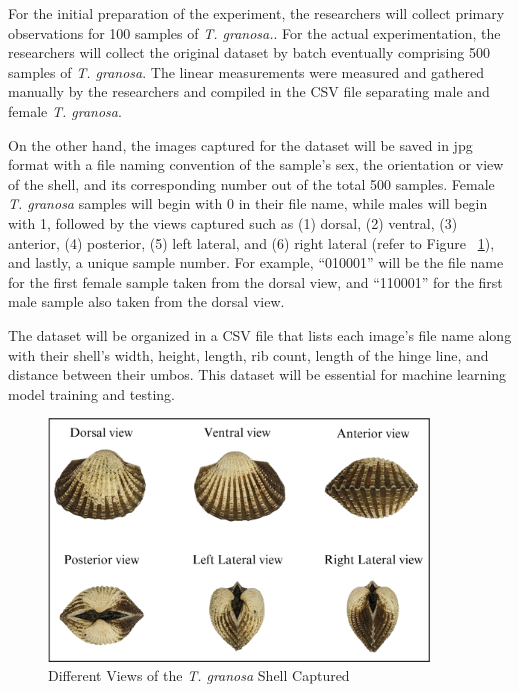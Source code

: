 For the initial preparation of the experiment, the researchers will collect primary observations for 100 samples of \textit{T. granosa.}. For the actual experimentation, the researchers will collect the original dataset by batch eventually comprising 500 samples of \textit{T. granosa}. The linear measurements were measured and gathered manually by the researchers and compiled in the CSV file separating male and female \textit{T. granosa}. 

On the other hand, the images captured for the dataset will be saved in jpg format with a file naming convention of the sample’s sex, the orientation or view of the shell, and its corresponding number out of the total 500 samples. Female \textit{T. granosa} samples will begin with 0 in their file name, while males will begin with 1, followed by the views captured such as (1) dorsal, (2) ventral, (3) anterior, (4) posterior, (5) left lateral, and (6) right lateral (refer to Figure ~\ref{fig:granosa_views}), and lastly, a unique sample number. For example, “010001” will be the file name for the first female sample taken from the dorsal view, and “110001” for the first male sample also taken from the dorsal view. 

The dataset will be organized in a CSV file that lists each image’s file name along with their shell’s width, height, length, rib count, length of the hinge line, and distance between their umbos. This dataset will be essential for machine learning model training and testing. 

\begin{figure}[!htbp]
	\centering
	\includegraphics[width=0.9\textwidth]{figures/view.png}
	\caption{Different Views of the \textit{T. granosa} Shell Captured}
	\label{fig:granosa_views}
\end{figure}

